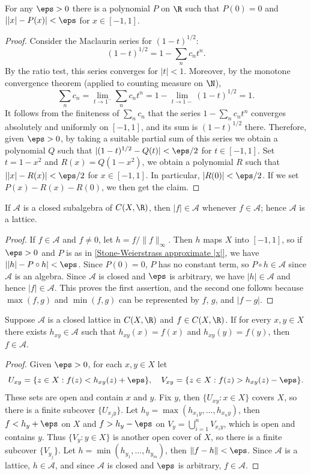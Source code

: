 \begin{lemma}\label{Stone-Weierstrass approximate |x|}
For any $\eps>0$ there is a polynomial $P$ on $\R$ such that $P(0)=0$ and $||x|-P(x)|<\eps$ for $x\in[-1,1]$.
\end{lemma}
\begin{proof}
Consider the Maclaurin series for $(1-t)^{1/2}$:
\[(1-t)^{1/2}=1-\sum_nc_nt^n.\]
By the ratio test, this series converges for $|t|<1$. Moreover, by the monotone convergence theorem (applied to counting measure on $\N$),
\[\sum_nc_n=\lim_{t\to 1^-}\sum_nc_nt^n=1-\lim_{t\to 1-}(1-t)^{1/2}=1.\]
It follows from the finiteness of $\sum_nc_n$ that the series $1-\sum_nc_nt^n$ converges absolutely and uniformly on $[-1,1]$, and its sum is $(1-t)^{1/2}$ there. Therefore, given $\eps>0$, by taking a suitable partial sum of this series we obtain a polynomial $Q$ such that $|(1-t)^{1/2}-Q(t)|<\eps/2$ for $t\in[-1,1]$. Set $t=1-x^2$ and $R(x)=Q(1-x^2)$, we obtain a polynomial $R$ such that $||x|-R(x)|<\eps/2$ for $x\in[-1,1]$. In particular, $|R(0)|<\eps/2$. If we set $P(x)-R(x)-R(0)$, we then get the claim. 
\end{proof}
\begin{lemma}\label{Stone-Weierstrass closed subalgebra is lattice}
If $\mathscr{A}$ is a closed subalgebra of $C(X,\R)$, then $|f|\in\mathscr{A}$ whenever $f\in\mathscr{A}$; hence $\mathscr{A}$ is a lattice.
\end{lemma}
\begin{proof}
If $f\in\mathscr{A}$ and $f\neq 0$, let $h=f/\|f\|_\infty$. Then $h$ maps $X$ into $[-1,1]$, so if $\eps>0$ and $P$ is as in \cref{Stone-Weierstrass approximate |x|}, we have $||h|-P\circ h|<\eps$. Since $P(0)=0$, $P$ has no constant term, so $P\circ h\in\mathscr{A}$ since $\mathscr{A}$ is an algebra. Since $\mathscr{A}$ is closed and $\eps$ is arbitrary, we have $|h|\in\mathscr{A}$ and hence $|f|\in\mathscr{A}$. This proves the first assertion, and the second one follows because $\max(f,g)$ and $\min(f,g)$ can be represented by $f$, $g$, and $|f-g|$.
\end{proof}
\begin{lemma}\label{Stone-Weierstrass two point}
Suppose $\mathscr{A}$ is a closed lattice in $C(X,\R)$ and $f\in C(X,\R)$. If for every $x,y\in X$ there exists $h_{xy}\in\mathscr{A}$ such that $h_{xy}(x)=f(x)$ and $h_{xy}(y)=f(y)$, then $f\in\mathscr{A}$.
\end{lemma}
\begin{proof}
Given $\eps>0$, for each $x,y\in X$ let
\[U_{xy}=\{z\in X:f(z)<h_{xy}(z)+\eps\},\quad V_{xy}=\{z\in X:f(z)>h_{xy}(z)-\eps\}.\]
These sets are open and contain $x$ and $y$. Fix $y$, then $\{U_{xy}:x\in X\}$ covers $X$, so there is a finite subcover $\{U_{x_jy}\}$. Let $h_y=\max(h_{x_1y},\dots,h_{x_ny})$, then $f<h_y+\eps$ on $X$ and $f>h_y-\eps$ on $V_y=\bigcup_{i=1}^{n}V_{x_iy}$, which is open and contains $y$. Thus $\{V_y:y\in X\}$ is another open cover of $X$, so there is a finite subcover $\{V_{y_j}\}$. Let $h=\min(h_{y_1},\dots,h_{y_m})$, then $\|f-h\|<\eps$. Since $\mathscr{A}$ is a lattice, $h\in\mathscr{A}$, and since $\mathscr{A}$ is closed and $\eps$ is arbitrary, $f\in\mathscr{A}$.
\end{proof}
